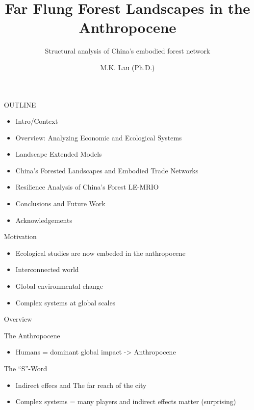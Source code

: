 \documentclass[ignorenonframetext,]{beamer}
\title{Far Flung Forest Landscapes in the Anthropocene}
\subtitle{Structural analysis of China's embodied forest network}
\author{M.K. Lau (Ph.D.)}
\date{}
\providecommand{\tightlist}{%
  \setlength{\itemsep}{0pt}\setlength{\parskip}{0pt}}
\begin{document}
\frame{\titlepage}

\begin{frame}{OUTLINE}
\protect\hypertarget{outline}{}

\begin{itemize}
\tightlist
\item
  Intro/Context
\item
  Overview: Analyzing Economic and Ecological Systems
\item
  Landscape Extended Models
\item
  China's Forested Landscapes and Embodied Trade Networks
\item
  Resilience Analysis of China's Forest LE-MRIO
\item
  Conclusions and Future Work
\item
  Acknowledgements
\end{itemize}

\end{frame}

\begin{frame}{Motivation}
\protect\hypertarget{motivation}{}

\begin{itemize}
\tightlist
\item
  Ecological studies are now embeded in the anthropocene
\item
  Interconnected world
\item
  Global environmental change
\item
  Complex systems at global scales
\end{itemize}

\end{frame}

\begin{frame}{Overview}
\protect\hypertarget{overview}{}

\end{frame}

\begin{frame}{The Anthropocene}
\protect\hypertarget{the-anthropocene}{}

\begin{itemize}
\tightlist
\item
  Humans = dominant global impact -\textgreater{} Anthropocene
\end{itemize}

\end{frame}

\begin{frame}{The ``S''-Word}
\protect\hypertarget{the-s-word}{}

\begin{itemize}
\tightlist
\item
  Indirect effecs and The far reach of the city
\item
  Complex systems = many players and indirect effects matter
  (surprising)
\end{itemize}

\end{frame}
\end{document}
